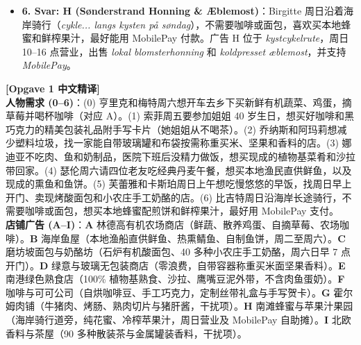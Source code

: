 \begin{answerbox}
\begin{itemize}
  \textbf{排雷}：\textbf{H} 虽然周日营业，但只卖蜂蜜、苹果汁和果酱，没有面包和奶酪。
  \item \textbf{6. Svar: H (Sønderstrand Honning \& Æblemost)}：Birgitte 周日沿着海岸骑行（\textit{cykle... langs kysten på søndag}），不需要咖啡或面包，喜欢买本地蜂蜜和鲜榨果汁，最好能用 MobilePay 付款。广告 H 位于 \textit{kystcykelrute}，周日 10--16 点营业，出售 \textit{lokal blomsterhonning} 和 \textit{koldpresset æblemost}，并支持 \textit{MobilePay}。
\end{itemize}

\vspace{0.3em}
\textbf{\color{NCDTeal}[Opgave 1 中文精译]}\\
\textbf{人物需求 (0--6)}：(0) 亨里克和梅特周六想开车去乡下买新鲜有机蔬菜、鸡蛋，摘草莓并喝杯咖啡（对应 A）。(1) 索菲周五要参加姐姐 40 岁生日，想买好咖啡和黑巧克力的精美包装礼品附手写卡片（她姐姐从不喝茶）。(2) 乔纳斯和阿玛莉想减少塑料垃圾，找一家能自带玻璃罐和布袋按需称重买米、坚果和香料的店。(3) 娜迪亚不吃肉、鱼和奶制品，医院下班后没精力做饭，想买现成的植物基菜肴和沙拉带回家。(4) 瑟伦周六请四位老友吃经典丹麦午餐，想买本地渔民直供鲜鱼，以及现成的熏鱼和鱼饼。(5) 芙蕾雅和卡斯珀周日上午想吃慢悠悠的早饭，找周日早上开门、卖现烤酸面包和小农庄手工奶酪的店。(6) 比吉特周日沿海岸长途骑行，不需要咖啡或面包，想买本地蜂蜜配煎饼和鲜榨果汁，最好用 MobilePay 支付。\\
\textbf{店铺广告 (A--I)}：\textbf{A} 林德高有机农场商店（鲜蔬、散养鸡蛋、自摘草莓、农场咖啡）。\textbf{B} 海岸鱼屋（本地渔船直供鲜鱼、热熏鲭鱼、自制鱼饼，周二至周六）。\textbf{C} 磨坊坡面包与奶酪坊（石炉有机酸面包、40 多种小农庄手工奶酪，周六日早 7 点开门）。\textbf{D} 绿意与玻璃无包装商店（零浪费，自带容器称重买米面坚果香料）。\textbf{E} 南港绿色熟食店（100\% 植物基熟食、沙拉、鹰嘴豆泥外带，不含肉鱼蛋奶）。\textbf{F} 咖啡与可可公司（自烘咖啡豆、手工巧克力，定制丝带礼盒与手写贺卡）。\textbf{G} 霍尔姆肉铺（牛猪肉、烤肠、熟肉切片与猪肝酱，干扰项）。\textbf{H} 南滩蜂蜜与苹果汁果园（海岸骑行道旁，纯花蜜、冷榨苹果汁，周日营业及 MobilePay 自助摊）。\textbf{I} 北欧香料与茶屋（90 多种散装茶与金属罐装香料，干扰项）。


\end{answerbox}
